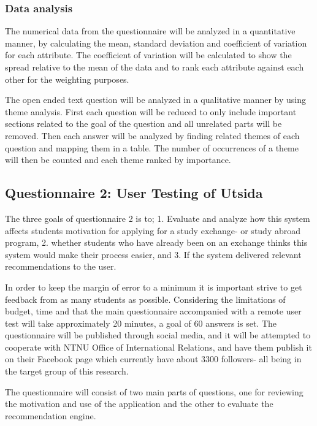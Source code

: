 \subsubsection{Data analysis}
The numerical data from the questionnaire will be analyzed in a quantitative manner, by calculating the mean, standard deviation and coefficient of variation for each attribute. The coefficient of variation will be calculated to show the spread relative to the mean of the data and to rank each attribute against each other for the weighting purposes. 

The open ended text question will be analyzed in a qualitative manner by using theme analysis. First each question will be reduced to only include important sections related to the goal of the question and all unrelated parts will be removed. Then each answer will be analyzed by finding related themes of each question and mapping them in a table. The number of occurrences of a theme will then be counted and each theme ranked by importance. 

\subsection{Questionnaire 2: User Testing of Utsida}\label{sec:questionnaire_2}

The three goals of questionnaire 2 is to; 1. Evaluate and analyze how this system affects students motivation for applying for a study exchange- or study abroad program, 2. whether students who have already been on an exchange thinks this system would make their process easier, and 3. If the system delivered relevant recommendations to the user.

In order to keep the margin of error to a minimum it is important strive to get feedback from as many students as possible. Considering the limitations of budget, time and that the main questionnaire accompanied with a remote user test will take approximately 20 minutes, a goal of 60 answers is set. The questionnaire will be published through social media, and it will be attempted to cooperate with NTNU Office of International Relations, and have them publish it on their Facebook page which currently have about 3300 followers- all being in the target group of this research.

The questionnaire will consist of two main parts of questions, one for reviewing the motivation and use of the application and the other to evaluate the recommendation engine.


